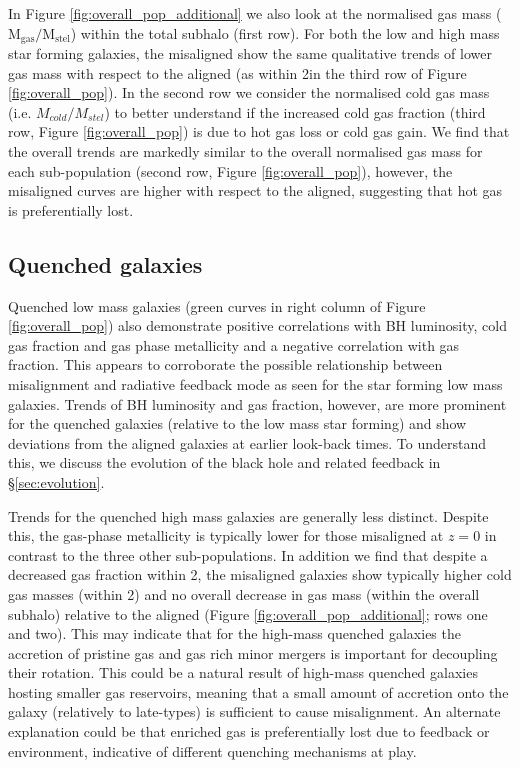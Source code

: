 In Figure \ref{fig:overall_pop_additional} we also look at the normalised gas mass ($\mathrm{M_{gas} / M_{stel}}$) within the total subhalo (first row). For both the low and high mass star forming galaxies, the misaligned show the same qualitative trends of lower gas mass with respect to the aligned (as within 2\re in the third row of Figure \ref{fig:overall_pop}). In the second row we consider the normalised cold gas mass (i.e. $M_{cold} / M_{stel}$) to better understand if the increased cold gas fraction (third row, Figure \ref{fig:overall_pop}) is due to hot gas loss or cold gas gain. We find that the overall trends are markedly similar to the overall normalised gas mass for each sub-population (second row, Figure \ref{fig:overall_pop}), however, the misaligned curves are higher with respect to the aligned, suggesting that hot gas is preferentially lost. 

\subsection{Quenched galaxies}
Quenched low mass galaxies (green curves in right column of Figure \ref{fig:overall_pop}) also demonstrate positive correlations with BH luminosity, cold gas fraction and gas phase metallicity and a negative correlation with gas fraction. This appears to corroborate the possible relationship between misalignment and radiative feedback mode as seen for the star forming low mass galaxies. Trends of BH luminosity and gas fraction, however, are more prominent for the quenched galaxies (relative to the low mass star forming) and show deviations from the aligned galaxies at earlier look-back times. To understand this, we discuss the evolution of the black hole and related feedback in \S\ref{sec:evolution}.

Trends for the quenched high mass galaxies are generally less distinct. Despite this, the gas-phase metallicity is typically lower for those misaligned at $z=0$ in contrast to the three other sub-populations. In addition we find that despite a decreased gas fraction within 2\re, the misaligned galaxies show typically higher cold gas masses (within 2\re) and no overall decrease in gas mass (within the overall subhalo) relative to the aligned (Figure \ref{fig:overall_pop_additional}; rows one and two). This may indicate that for the high-mass quenched galaxies the accretion of pristine gas and gas rich minor mergers is important for decoupling their rotation. This could be a natural result of high-mass quenched galaxies hosting smaller gas reservoirs, meaning that a small amount of accretion onto the galaxy (relatively to late-types) is sufficient to cause misalignment. An alternate explanation could be that enriched gas is preferentially lost due to feedback or environment, indicative of different quenching mechanisms at play.

